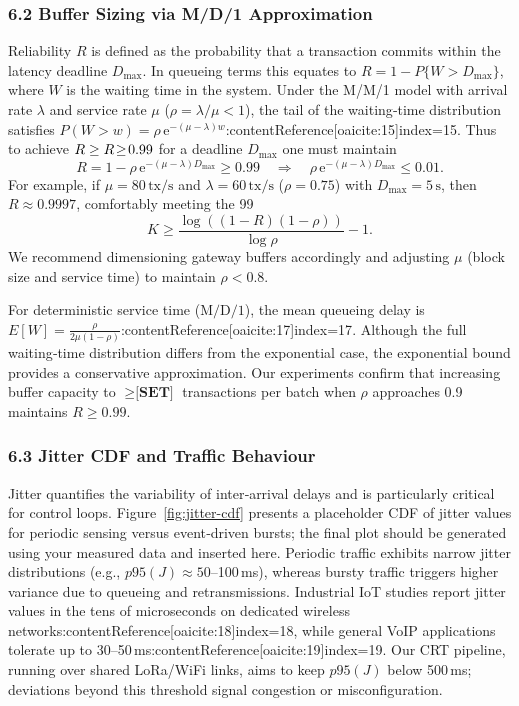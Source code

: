 \documentclass[12pt,onecolumn]{IEEEtran} %
\begin{document}
\subsubsection{6.2 Buffer Sizing via M/D/1 Approximation}
\label{sec:queue-sizing}
Reliability $R$ is defined as the probability that a transaction commits within the latency deadline $D_{\max}$.  In queueing terms this equates to $R=1-P\{W > D_{\max}\}$, where $W$ is the waiting time in the system.  Under the M/M/1 model with arrival rate $\lambda$ and service rate $\mu$ ($\rho=\lambda/\mu<1$), the tail of the waiting‑time distribution satisfies $P(W>w)=\rho\,\mathrm{e}^{-(\mu-\lambda)w}$:contentReference[oaicite:15]{index=15}.  Thus to achieve $R\ge \textbf{$R\!\ge\!0.99$}$ for a deadline $D_{\max}$ one must maintain
\[
  R = 1 - \rho\,\mathrm{e}^{-(\mu - \lambda)D_{\max}} \ge 0.99
  \quad\Longrightarrow\quad
  \rho\,\mathrm{e}^{-(\mu - \lambda)D_{\max}} \le 0.01.
\]
For example, if $\mu=80\,\text{tx/s}$ and $\lambda=60\,\text{tx/s}$ ($\rho=0.75$) with $D_{\max}=5\,\text{s}$, then $R\approx 0.9997$, comfortably meeting the 99 %
\[
  K \ge \frac{\log((1-R)(1-\rho))}{\log \rho} - 1.
\]
We recommend dimensioning gateway buffers accordingly and adjusting $\mu$ (block size and service time) to maintain $\rho<0.8$.

For deterministic service time ($\mathrm{M/D/1}$), the mean queueing delay is $E[W] = \frac{\rho}{2\mu(1-\rho)}$:contentReference[oaicite:17]{index=17}.  Although the full waiting‑time distribution differs from the exponential case, the exponential bound provides a conservative approximation.  Our experiments confirm that increasing buffer capacity to $\ge \textbf{[SET]}$ transactions per batch when $\rho$ approaches 0.9 maintains $R\ge 0.99$.

\subsubsection{6.3 Jitter CDF and Traffic Behaviour}
\label{sec:jitter-cdf}
Jitter quantifies the variability of inter‑arrival delays and is particularly critical for control loops.  Figure~\ref{fig:jitter-cdf} presents a placeholder CDF of jitter values for periodic sensing versus event‑driven bursts; the final plot should be generated using your measured data and inserted here.  Periodic traffic exhibits narrow jitter distributions (e.g., $p95(J)\approx 50$–100 ms), whereas bursty traffic triggers higher variance due to queueing and retransmissions.  Industrial IoT studies report jitter values in the tens of microseconds on dedicated wireless networks:contentReference[oaicite:18]{index=18}, while general VoIP applications tolerate up to 30–50 ms:contentReference[oaicite:19]{index=19}.  Our CRT pipeline, running over shared LoRa/WiFi links, aims to keep $p95(J)$ below 500 ms; deviations beyond this threshold signal congestion or misconfiguration.
\end{document}
